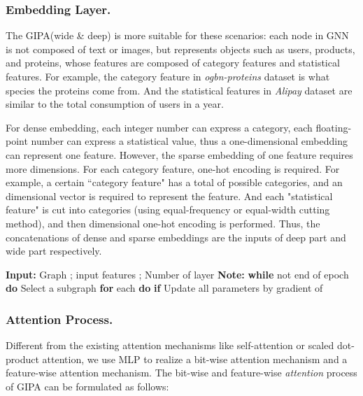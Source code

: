 \documentclass[runningheads]{llncs}
\newcommand{\model}{GIPA\xspace}
\begin{document}
\subsubsection{Embedding Layer.}
The \model (wide \& deep) is more suitable for these scenarios: each node in GNN is not composed of text or images, but represents objects such as users, products, and proteins, whose features are composed of category features and statistical features. 
For example, the category feature in \textit{ogbn-proteins} dataset is what species the proteins come from. 
And the statistical features in \textit{Alipay} dataset are similar to the total consumption of users in a year.

For dense embedding, each integer number can express a category, each floating-point number can express a statistical value, thus a one-dimensional embedding can represent one feature.
However, the sparse embedding of one feature requires more dimensions.
For each category feature, one-hot encoding is required. 
For example, a certain ``category feature" has a total of  possible categories, and an  dimensional vector is required to represent the feature.
And each "statistical feature" is cut into  categories (using equal-frequency or equal-width cutting method), and then  dimensional one-hot encoding is performed.
Thus, the concatenations of dense and sparse embeddings are the inputs of deep part and wide part respectively.


\begin{algorithm}[t]
\caption{The optimization strategy of GIPA}
\label{alg::algorithm1}
\begin{algorithmic}[1]
\State \textbf{Input:} Graph ; input features ; Number of layer 
\State \textbf{Note:} 
\State   \State 
\State\textbf{while} not end of epoch \textbf{do}
\State \qquad Select a subgraph 
\State \qquad \textbf{for} each  \textbf{do}
\State \qquad \qquad \textbf{if} 
\State \qquad \qquad \qquad 
\State \qquad \qquad 
\State \qquad \qquad 
\State \qquad \qquad 
\State \qquad 
\State \qquad 
\State \qquad Update all parameters by gradient of 
\end{algorithmic}
\end{algorithm}

\subsubsection{Attention Process.}
Different from the existing attention mechanisms like self-attention or scaled dot-product attention, we use MLP to realize a bit-wise attention mechanism and a feature-wise attention mechanism.
The bit-wise  and feature-wise \textit{attention} process of \model can be formulated as follows:
\end{document}

